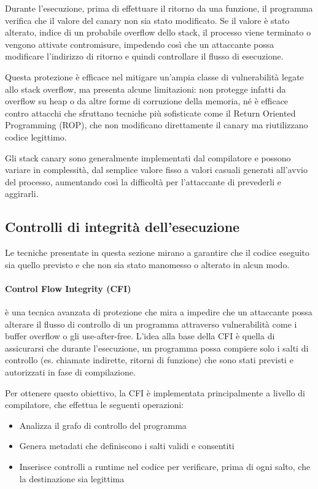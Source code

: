 Durante l'esecuzione, prima di effettuare il ritorno da una funzione, il programma
verifica che il valore del canary non sia stato modificato. Se il valore è stato
alterato, indice di un probabile overflow dello stack, il processo viene
terminato o vengono attivate contromisure, impedendo così che un attaccante possa
modificare l'indirizzo di ritorno e quindi controllare il flusso di esecuzione.

Questa protezione è efficace nel mitigare un'ampia classe di vulnerabilità legate
allo stack overflow, ma presenta alcune limitazioni: non protegge infatti da overflow
su heap o da altre forme di corruzione della memoria, né è efficace contro
attacchi che sfruttano tecniche più sofisticate come il Return Oriented
Programming (ROP), che non modificano direttamente il canary ma riutilizzano codice
legittimo.

Gli stack canary sono generalmente implementati dal compilatore e possono variare
in complessità, dal semplice valore fisso a valori casuali generati all'avvio
del processo, aumentando così la difficoltà per l'attaccante di prevederli e aggirarli.~\cite{stack_canaries}

\subsection{Controlli di integrità dell'esecuzione}
\label{sec:execution-integrity} Le tecniche presentate in questa sezione mirano a
garantire che il codice eseguito sia quello previsto e che non sia stato manomesso
o alterato in alcun modo.

\paragraph{Control Flow Integrity (CFI)}
è una tecnica avanzata di protezione che mira a impedire che un attaccante possa
alterare il flusso di controllo di un programma attraverso vulnerabilità come i
buffer overflow o gli use-after-free. L'idea alla base della CFI è quella di assicurarsi
che durante l'esecuzione, un programma possa compiere solo i salti di controllo
(es. chiamate indirette, ritorni di funzione) che sono stati previsti e
autorizzati in fase di compilazione.

Per ottenere questo obiettivo, la CFI è implementata principalmente a livello di
compilatore, che effettua le seguenti operazioni:
\begin{itemize}
  \item Analizza il grafo di controllo del programma

  \item Genera metadati che definiscono i salti validi e consentiti

  \item Inserisce controlli a runtime nel codice per verificare, prima di ogni
    salto, che la destinazione sia legittima
\end{itemize}

